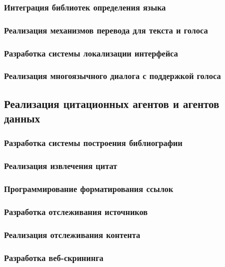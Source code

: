 \documentclass{syksu-coursework}
\begin{document}
\subsubsection{Интеграция библиотек определения языка}

\subsubsection{Реализация механизмов перевода для текста и голоса}

\subsubsection{Разработка системы локализации интерфейса}

\subsubsection{Реализация многоязычного диалога с поддержкой голоса}

\subsection{Реализация цитационных агентов и агентов данных}

\subsubsection{Разработка системы построения библиографии}

\subsubsection{Реализация извлечения цитат}

\subsubsection{Программирование форматирования ссылок}

\subsubsection{Разработка отслеживания источников}

\subsubsection{Реализация отслеживания контента}

\subsubsection{Разработка веб-скрининга}
\end{document}
